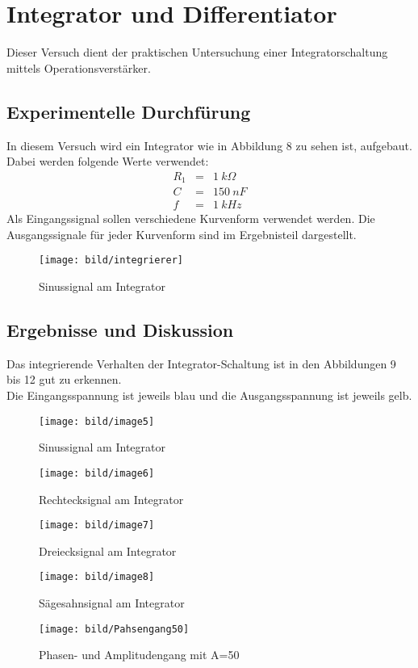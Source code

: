 \section{Integrator und Differentiator}
Dieser Versuch dient der praktischen Untersuchung einer Integratorschaltung mittels
Operationsverst\"arker.
\subsection{Experimentelle Durchf\"urung}
In diesem Versuch wird ein Integrator wie in Abbildung 8 zu sehen ist, aufgebaut. Dabei werden folgende Werte verwendet:
\begin{eqnarray*}
R_1 &=& 1~k\Omega\\
C &=& 150~nF\\
f &=& 1~kHz
\end{eqnarray*}
Als Eingangssignal sollen verschiedene Kurvenform verwendet werden. Die Ausgangssignale f\"ur jeder Kurvenform sind im Ergebnisteil dargestellt. 
\begin{figure}[!ht]
\begin{center}
\texttt{[image: bild/integrierer]}
\caption{Sinussignal am Integrator}
\end{center}
\end{figure}
\newpage
\subsection{Ergebnisse und Diskussion}
Das integrierende Verhalten der Integrator-Schaltung ist in den Abbildungen 9 bis 12 gut zu erkennen.\\
Die Eingangsspannung ist jeweils blau und die Ausgangsspannung ist jeweils gelb.
\begin{figure}[!h]
\begin{minipage}{0.4\textwidth}
\begin{center}
\texttt{[image: bild/image5]}
\caption{Sinussignal am Integrator}
\end{center}
\end{minipage}
\hfill
\begin{minipage}{0.4\textwidth}
\begin{center}
\texttt{[image: bild/image6]}
\caption{Rechtecksignal am Integrator}
\end{center}
\end{minipage}
\end{figure}
\begin{figure}[!ht]
\begin{minipage}{0.4\textwidth}
\begin{center}
\texttt{[image: bild/image7]}
\caption{Dreiecksignal am Integrator}
\end{center}
\end{minipage}
\hfill
\begin{minipage}{0.4\textwidth}
\begin{center}
\texttt{[image: bild/image8]}
\caption{S\"agesahnsignal am Integrator}
\end{center}
\end{minipage}
\end{figure}

\newpage
\begin{figure}[!ht]
\begin{center}
\texttt{[image: bild/Pahsengang50]}
\caption{Phasen- und Amplitudengang mit A=50}
\end{center}
\end{figure}

